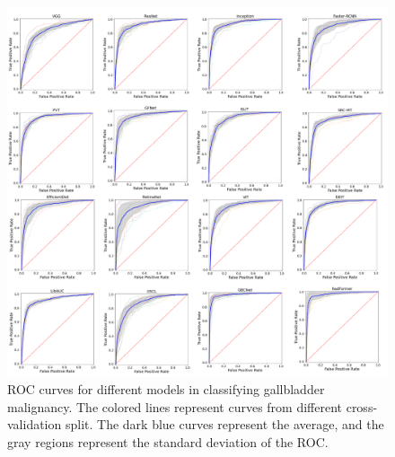 \documentclass[twocolumn,final]{elsarticle}
\begin{document}
%
\begin{figure}[t]
    \centering
    \includegraphics[width=\textwidth]{figs/xai-roc.png}
    \caption{ROC curves for different models in classifying gallbladder malignancy. The colored lines represent curves from different cross-validation split. The dark blue curves represent the average, and the gray regions represent the standard deviation of the ROC.}
    \label{fig:roc_kfold}
\end{figure}
%
\end{document}
